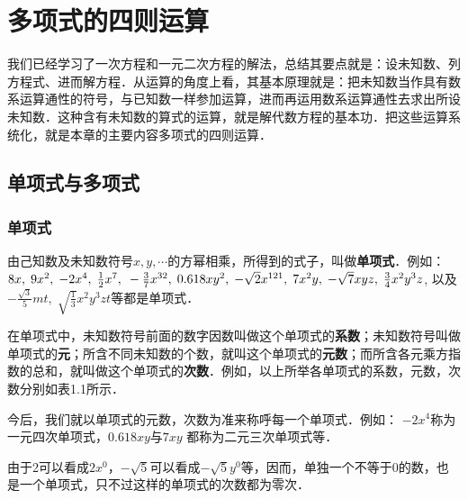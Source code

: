 \chapter{多项式的四则运算}

我们已经学习了一次方程和一元二次方程的解法，总结其要点就是：设未知数、列方程式、进而解方程．从运算的角度上看，其基本原理就是：把未知数当作具有数系运算通性的符号，与已知数一样参加运算，进而再运用数系运算通性去求出所设未知数．这种含有未知数的算式的运算，就是解代数方程的基本功．把这些运算系统化，就是本章的主要内容多项式的四则运算．

\section{单项式与多项式}
\subsection{单项式}
由己知数及未知数符号$x,y,\cdots$的方幂相乘，所得到的式子，叫做\textbf{单项式}．例如：
$8x,\; 9x^2,\; -2x^4,\; \frac{1}{2}x^7,\\\; -\frac{3}{7}x^{32},\; 0.618xy^2,\; -\sqrt{2}x^{121},\; 7x^2y,\; -\sqrt{7}xyz,\; \frac{3}{4}x^2y^3z$, 以及$-\frac{\sqrt{3}}{5}mt,\; \sqrt{\frac{1}{3}}x^2y^3zt$等都是单项式．

在单项式中，未知数符号前面的数字因数叫做这个单项式的\textbf{系数}；未知数符号叫做单项式的\textbf{元}；所含不同未知数的个数，就叫这个单项式的\textbf{元数}；而所含各元乘方指数的总和，就叫做这个单项式的\textbf{次数}．例如，以上所举各单项式的系数，元数，次数分别如表1.1所示．


今后，我们就以单项式的元数，次数为准来称呼每一个单项式．例如：
$-2x^4$称为一元四次单项式，$0.618xy$与$7xy$
都称为二元三次单项式等．

由于2可以看成$2x^0$，$-\sqrt{5}$可以看成$-\sqrt{5}y^0$等，因而，单独一个不等于0的数，也是一个单项式，只不过这样的单项式的次数都为零次．


